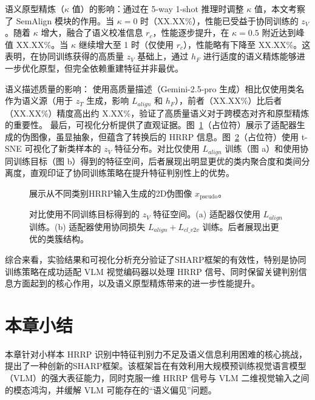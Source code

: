  语义原型精炼（$\kappa$ 值）的影响：通过在 5-way 1-shot 推理时调整 $\kappa$ 值，本文考察了 SemAlign 模块的作用。当 $\kappa=0$ 时（XX.XX\%），性能已受益于协同训练的 $z_V$。随着 $\kappa$ 增大，融合了语义校准信息 $r_c$，性能逐步提升，在 $\kappa=0.5$ 附近达到峰值 XX.XX\%。当 $\kappa$ 继续增大至 1 时（仅使用 $r_c$），性能略有下降至 XX.XX\%。这表明，在协同训练获得的高质量 $z_V$ 基础上，通过 $h_F$ 进行适度的语义精炼能够进一步优化原型，但完全依赖重建特征并非最优。
 
 语义描述质量的影响： 使用高质量描述（Gemini-2.5-pro 生成）相比仅使用类名作为语义源（用于 $z_T$ 生成，影响 $L_{align}$ 和 $h_F$），前者（XX.XX\%）比后者（XX.XX\%）精度高出约 X.XX\%，验证了高质量语义对于跨模态对齐和原型精炼的重要性。 最后，可视化分析提供了直观证据。图~\ref{fig:pseudo_images_semantic}（占位符）展示了适配器生成的伪图像，虽显抽象，但蕴含了转换后的 HRRP 信息。图~\ref{fig:tsne_adapter_semantic}（占位符）使用 t-SNE 可视化了新类样本的 $z_V$ 特征分布。对比仅使用 $L_{align}$ 训练（图 a）和使用协同训练目标（图 b）得到的特征空间，后者展现出明显更优的类内聚合度和类间分离度，直观印证了协同训练策略在提升特征判别性上的优势。 
 
 \begin{figure}[h!]
 \centering 
  \caption{展示从不同类别HRRP输入生成的2D伪图像 $x_{\text{pseudo}}$。} \label{fig:pseudo_images_semantic} 
 \end{figure} 
 
 \begin{figure}[h!] 
 \centering 
 \caption{对比使用不同训练目标得到的 $z_V$ 特征空间。(a) 适配器仅使用 $L_{align}$ 训练。(b) 适配器使用协同损失 $L_{align} + L_{cl\_v2v}$ 训练。后者展现出更优的类簇结构。} \label{fig:tsne_adapter_semantic} \end{figure} 
 
 综合来看，实验结果和可视化分析充分验证了SHARP框架的有效性，特别是协同训练策略在成功适配 VLM 视觉编码器以处理 HRRP 信号、同时保留关键判别信息方面起到的核心作用，以及语义原型精炼带来的进一步性能提升。
 
\section{本章小结}
\label{sec:semantic_summary}

本章针对小样本 HRRP 识别中特征判别力不足及语义信息利用困难的核心挑战，提出了一种创新的SHARP框架。该框架旨在有效利用大规模预训练视觉语言模型（VLM）的强大表征能力，同时克服一维 HRRP 信号与 VLM 二维视觉输入之间的模态鸿沟，并缓解 VLM 可能存在的“语义偏见”问题。 

